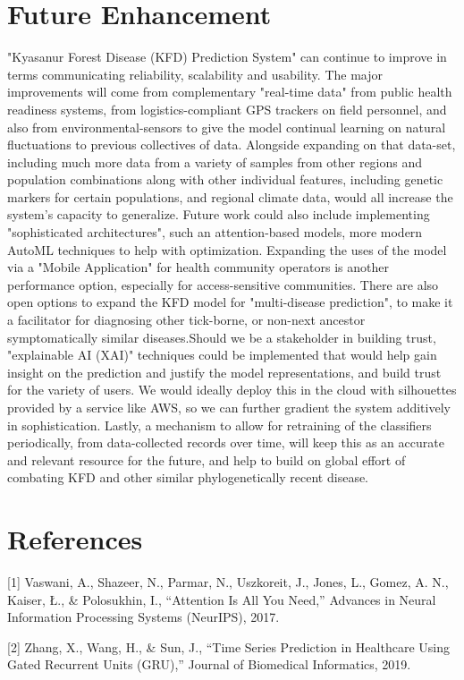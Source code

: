 \documentclass[conference]{IEEEtran}
\begin{document}
\section{Future Enhancement}
"Kyasanur Forest Disease (KFD) Prediction System" can continue to improve in terms communicating reliability, scalability and usability. The major improvements will come from complementary "real-time data" from public health readiness systems, from logistics-compliant GPS trackers on field personnel, and also from environmental-sensors to give the model continual learning on natural fluctuations to previous collectives of data. Alongside expanding on that data-set, including much more data from a variety of samples from other regions and population combinations along with other individual features, including genetic markers for certain populations, and regional climate data, would all increase the system's capacity to generalize. Future work could also include implementing "sophisticated architectures", such an attention-based models, more modern AutoML techniques to help with optimization. Expanding the uses of the model via a "Mobile Application" for health community operators is another performance option, especially for access-sensitive communities. There are also open options to expand the KFD model for "multi-disease prediction", to make it a facilitator for diagnosing other tick-borne, or non-next ancestor symptomatically similar diseases.Should we be a stakeholder in building trust, "explainable AI (XAI)" techniques could be implemented that would help gain insight on the prediction and justify the model representations, and build trust for the variety of users. We would ideally deploy this in the cloud with silhouettes provided by a service like AWS, so we can further gradient  the system additively in sophistication. Lastly, a mechanism to allow for retraining of the classifiers periodically, from data-collected records over time, will keep this as an accurate and relevant resource for the future, and help to build on global effort of combating KFD and other similar phylogenetically recent disease.
\section{References}
[1] Vaswani, A., Shazeer, N., Parmar, N., Uszkoreit, J., Jones, L., Gomez, A. N., Kaiser, Ł., \& Polosukhin, I., “Attention Is All You Need,” Advances in Neural Information Processing Systems (NeurIPS), 2017.

[2] Zhang, X., Wang, H., \& Sun, J., “Time Series Prediction in Healthcare Using Gated Recurrent Units (GRU),” Journal of Biomedical Informatics, 2019.
\end{document}
